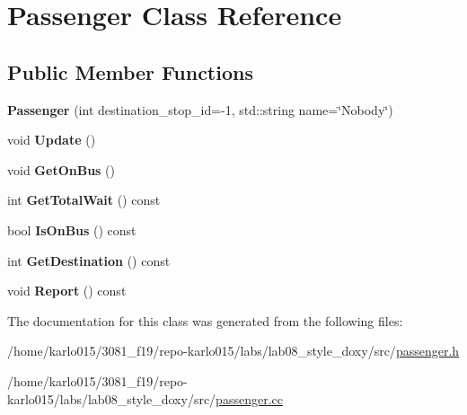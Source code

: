 \hypertarget{classPassenger}{}\section{Passenger Class Reference}
\label{classPassenger}
\subsection*{Public Member Functions}
\begin{DoxyCompactItemize}
\item 
\mbox{\label{classPassenger_a1524307315acd6da95bcb0e3b6d4ad40}} 
{\bfseries Passenger} (int destination\+\_\+stop\+\_\+id=-\/1, std\+::string name=\char`\"{}Nobody\char`\"{})
\item 
\mbox{\label{classPassenger_a960de3b29fc17a2c2d79c0b79d5cf299}} 
void {\bfseries Update} ()
\item 
\mbox{\label{classPassenger_ae2ba639cfef39781ac079778578bd9fe}} 
void {\bfseries Get\+On\+Bus} ()
\item 
\mbox{\label{classPassenger_a25158560f790ef7ef06d94c414b34f25}} 
int {\bfseries Get\+Total\+Wait} () const
\item 
\mbox{\label{classPassenger_a2acf008ec444afcc859b914ee24add0e}} 
bool {\bfseries Is\+On\+Bus} () const
\item 
\mbox{\label{classPassenger_a49db0ee527377aae6077df190a11501c}} 
int {\bfseries Get\+Destination} () const
\item 
\mbox{\label{classPassenger_ac54ce797e412a4895febe10f07dc5df5}} 
void {\bfseries Report} () const
\end{DoxyCompactItemize}


The documentation for this class was generated from the following files\+:\begin{DoxyCompactItemize}
\item 
/home/karlo015/3081\+\_\+f19/repo-\/karlo015/labs/lab08\+\_\+style\+\_\+doxy/src/\hyperlink{passenger_8h}{passenger.\+h}\item 
/home/karlo015/3081\+\_\+f19/repo-\/karlo015/labs/lab08\+\_\+style\+\_\+doxy/src/\hyperlink{passenger_8cc}{passenger.\+cc}\end{DoxyCompactItemize}
